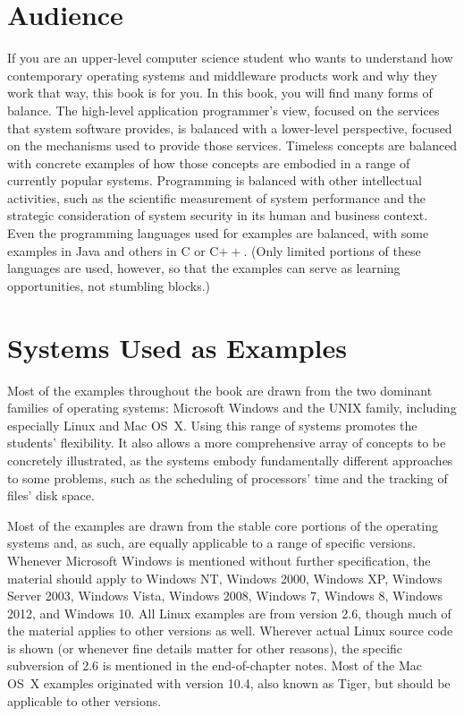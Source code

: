 \section*{Audience}

If you are an upper-level computer science student who wants to
understand how contemporary operating systems and middleware products
work and why they work that way, this book is for you.  In this book,
you will find many forms of balance.  The high-level application
programmer's view, focused on the services that system software
provides, is balanced with a lower-level perspective, focused on the
mechanisms used to provide those services.  Timeless concepts are
balanced with concrete examples of how those concepts are embodied in
a range of currently popular systems.  Programming is balanced with
other intellectual activities, such as the scientific measurement of system
performance and the strategic consideration of system security in its
human and business context. Even the programming languages used for
examples are balanced, with some examples in Java and others in C or
C$++$.  (Only limited portions of these languages are used, however,
so that the examples can serve as learning opportunities, not
stumbling blocks.)

\section*{Systems Used as Examples}

Most of the examples throughout the book are drawn from the two
dominant families of operating systems: Microsoft Windows and the UNIX
family, including especially Linux and Mac OS~X.  Using this range of
systems promotes the students' flexibility.  It also allows a more
comprehensive array of concepts to be concretely illustrated, as the
systems embody fundamentally different approaches to some problems,
such as the scheduling of processors' time and the tracking of files'
disk space.

Most of the examples are drawn from the stable core portions of the
operating systems and, as such, are equally applicable to a range of
specific versions.  Whenever Microsoft Windows is mentioned without
further specification, the material should apply to Windows NT, Windows
2000, Windows XP, Windows Server 2003, Windows Vista, Windows 2008, Windows 7, Windows 8, Windows 2012, and Windows 10.  All Linux
examples are from version 2.6, though much of the material applies to
other versions as well.  Wherever actual Linux source code is shown
(or whenever fine details matter for other reasons), the specific subversion of
2.6 is mentioned in the end-of-chapter notes.  Most of the Mac OS~X examples
originated with version 10.4, also known as Tiger, but should be applicable to other versions.

